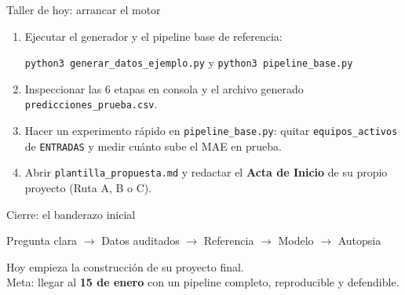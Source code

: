 \documentclass[aspectratio=169,11pt]{beamer}
\begin{document}
\begin{frame}{Taller de hoy: arrancar el motor}
  \begin{enumerate}
    \item Ejecutar el generador y el pipeline base de referencia:
      \begin{center}
        \texttt{python3 generar\_datos\_ejemplo.py} \quad y \quad \texttt{python3 pipeline\_base.py}
      \end{center}
    \item Inspeccionar las 6 etapas en consola y el archivo generado \texttt{predicciones\_prueba.csv}.
    \item Hacer un experimento rápido en \texttt{pipeline\_base.py}: quitar \texttt{equipos\_activos} de \texttt{ENTRADAS} y medir cuánto sube el MAE en prueba.
    \item Abrir \texttt{plantilla\_propuesta.md} y redactar el \textbf{Acta de Inicio} de su propio proyecto (Ruta A, B o C).
  \end{enumerate}
\end{frame}

\begin{frame}{Cierre: el banderazo inicial}
  \begin{center}
    \Large Pregunta clara $\rightarrow$ Datos auditados $\rightarrow$ Referencia $\rightarrow$ Modelo $\rightarrow$ Autopsia
  \end{center}
  \vfill
  \centering
  Hoy empieza la construcción de su proyecto final.\\
  Meta: llegar al \textbf{15 de enero} con un pipeline completo, reproducible y defendible.
\end{frame}
\end{document}
